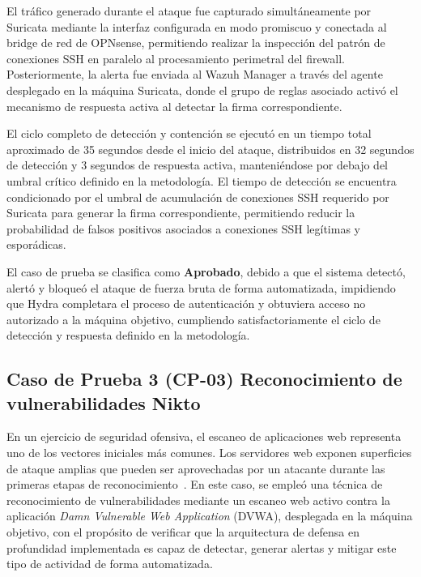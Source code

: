 El tráfico generado durante el ataque fue capturado simultáneamente por Suricata mediante la interfaz configurada en modo promiscuo y 
conectada al bridge de red de OPNsense, permitiendo realizar la inspección del patrón de conexiones SSH en paralelo al procesamiento 
perimetral del firewall. Posteriormente, la alerta fue enviada al Wazuh Manager a través del agente desplegado en la máquina Suricata, 
donde el grupo de reglas asociado activó el mecanismo de respuesta activa al detectar la firma correspondiente.

El ciclo completo de detección y contención se ejecutó en un tiempo total aproximado de 35 segundos desde el inicio del ataque, 
distribuidos en 32 segundos de detección y 3 segundos de respuesta activa, manteniéndose por debajo del umbral crítico definido en la 
metodología. El tiempo de detección se encuentra condicionado por el umbral de acumulación de conexiones SSH requerido por Suricata para 
generar la firma correspondiente, permitiendo reducir la probabilidad de falsos positivos asociados a conexiones SSH legítimas y 
esporádicas.

El caso de prueba se clasifica como \textbf{Aprobado}, debido a que el sistema detectó, alertó y bloqueó el ataque de fuerza bruta de 
forma automatizada, impidiendo que Hydra completara el proceso de autenticación y obtuviera acceso no autorizado a la máquina objetivo, 
cumpliendo satisfactoriamente el ciclo de detección y respuesta definido en la metodología.


\subsection{Caso de Prueba 3 (CP-03) Reconocimiento de vulnerabilidades Nikto}
\noindent

En un ejercicio de seguridad ofensiva, el escaneo de aplicaciones web representa uno de los vectores iniciales más comunes. Los 
servidores web exponen superficies de ataque amplias que pueden ser aprovechadas por un atacante durante las primeras etapas de 
reconocimiento~\cite{MITREATTACK2026}. En este caso, se empleó una técnica de reconocimiento de vulnerabilidades mediante un escaneo web 
activo contra la aplicación \textit{Damn Vulnerable Web Application} (DVWA), desplegada en la máquina objetivo, con el propósito de 
verificar que la arquitectura de defensa en profundidad implementada es capaz de detectar, generar alertas y mitigar este tipo de 
actividad de forma automatizada.

